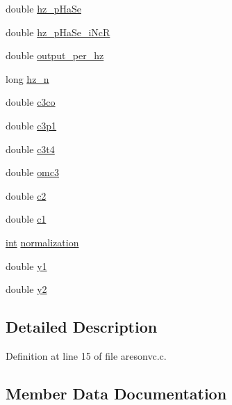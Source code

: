 \begin{DoxyCompactItemize}
\item 
double \hyperlink{structaresonvc__susp__struct_a4821ea5e40628b130fb854b95ae601df}{hz\+\_\+p\+Ha\+Se}
\item 
double \hyperlink{structaresonvc__susp__struct_adc08ab4d1e0f3cfbb4d0549a1397e198}{hz\+\_\+p\+Ha\+Se\+\_\+i\+NcR}
\item 
double \hyperlink{structaresonvc__susp__struct_af08f1a92af933a540a711bd34a82cd5f}{output\+\_\+per\+\_\+hz}
\item 
long \hyperlink{structaresonvc__susp__struct_ad8019575d7c37f9d5f7926637519ce1b}{hz\+\_\+n}
\item 
double \hyperlink{structaresonvc__susp__struct_a01bd70fa672290e84a2f549b935ab042}{c3co}
\item 
double \hyperlink{structaresonvc__susp__struct_a2ca29ef23bf7e8c0963611ef9fcbd995}{c3p1}
\item 
double \hyperlink{structaresonvc__susp__struct_a12c4e6622fe370f72361eeec90def8e0}{c3t4}
\item 
double \hyperlink{structaresonvc__susp__struct_af1a71e626a745e5b3812a802635378b4}{omc3}
\item 
double \hyperlink{structaresonvc__susp__struct_aadf5ccf821d2f232f58b8ed657669a79}{c2}
\item 
double \hyperlink{structaresonvc__susp__struct_a22dbd0b487e025f685fa635f7966636e}{c1}
\item 
\hyperlink{xmltok_8h_a5a0d4a5641ce434f1d23533f2b2e6653}{int} \hyperlink{structaresonvc__susp__struct_a9ca069daa918090b07e71f6ef7e0d550}{normalization}
\item 
double \hyperlink{structaresonvc__susp__struct_adc0d5a6181769d16ea9df947ea427522}{y1}
\item 
double \hyperlink{structaresonvc__susp__struct_a06de2c53180f638b821df583fda762eb}{y2}
\end{DoxyCompactItemize}


\subsection{Detailed Description}


Definition at line 15 of file aresonvc.\+c.



\subsection{Member Data Documentation}
